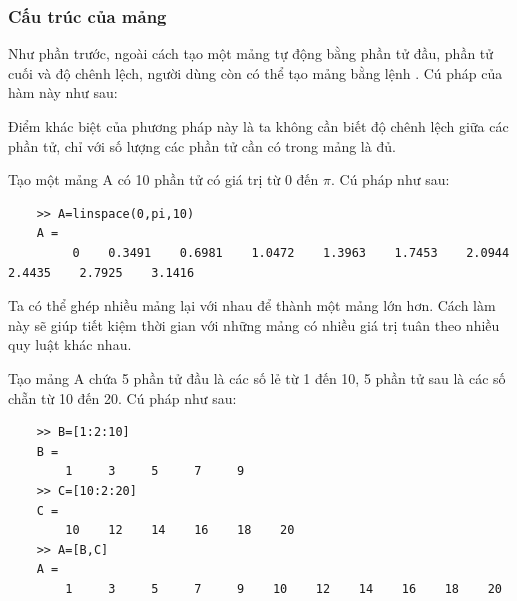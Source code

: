 \documentclass[12pt,a4paper]{article}
\begin{document}
\subsubsection{Cấu trúc của mảng}
Như phần trước, ngoài cách tạo một mảng tự động bằng phần tử đầu, phần tử cuối và độ chênh lệch, người dùng còn có thể tạo mảng bằng lệnh . Cú pháp của hàm này như sau:
\begin{center}
\end{center}
Điểm khác biệt của phương pháp này là ta không cần biết độ chênh lệch giữa các phần tử, chỉ với số lượng các phần tử cần có trong mảng là đủ.
\begin{example}
Tạo một mảng A có 10 phần tử có giá trị từ 0 đến $\pi$. Cú pháp như sau:
\begin{lstlisting}
	>> A=linspace(0,pi,10)
	A =
         0    0.3491    0.6981    1.0472    1.3963    1.7453    2.0944    2.4435    2.7925    3.1416
\end{lstlisting}	
\end{example}
Ta có thể ghép nhiều mảng lại với nhau để thành một mảng lớn hơn. Cách làm này sẽ giúp tiết kiệm thời gian với những mảng có nhiều giá trị tuân theo nhiều quy luật khác nhau.
\begin{example}
Tạo mảng A chứa 5 phần tử đầu là các số lẻ từ 1 đến 10, 5 phần tử sau là các số chẵn từ 10 đến 20. Cú pháp như sau:
\begin{lstlisting}
	>> B=[1:2:10]
	B =
     	1     3     5     7     9
	>> C=[10:2:20]
	C =
    	10    12    14    16    18    20
	>> A=[B,C]
	A =
     	1     3     5     7     9    10    12    14    16    18    20
\end{lstlisting}	
\end{example}
\end{document}
